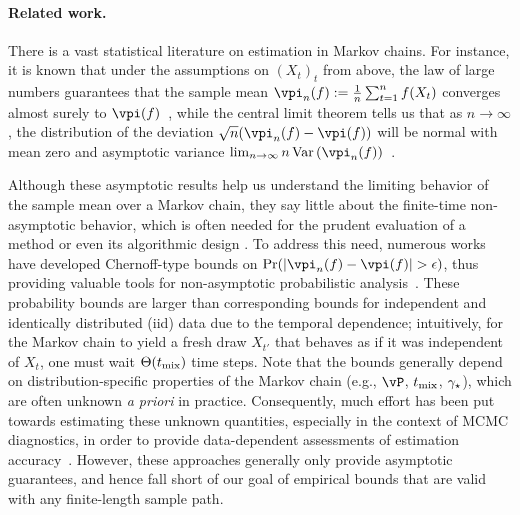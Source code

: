 \iffalse
\paragraph{Related work.}
There is a vast statistical literature on estimation in Markov chains.
For instance, it is known that under the assumptions on
$(X_t)_t$ from above, the law of large numbers guarantees that
the sample mean $\vpi_n(f) \defeq \frac1n \sum_{t=1}^n f(X_t)$
converges almost surely to $\vpi(f)$~\cite{meyn1993markov}, while the
central limit theorem tells us that as $n\to \infty$, the distribution
of the deviation $\sqrt{n}( \vpi_n(f)-\vpi(f))$ will be normal with
mean zero and asymptotic variance $\lim_{n\to\infty}
n\Var\Parens{\vpi_n(f)}$~\cite{kipnis1986central}.

Although these asymptotic results help us understand the limiting
behavior of the sample mean over a Markov chain, they say little about
the finite-time non-asymptotic behavior, which is often needed for the
prudent evaluation of a method or even its algorithmic design
\cite{
MCMCDiscussion93%
,DBLP:conf/valuetools/KontoyiannisLM06%
,BBL06%
,MniSzeAu08%
,MauPo09%
,LiLiWaSt11:KWIK%
,flegal2011implementing%
,Gyori-paulin15%
,SwaJoa15:LoggedBandit%
}.
To address this need, numerous works have developed Chernoff-type
bounds on $\Pr\parens{ |\vpi_n(f)-\vpi(f)| > \eps }$, thus providing
valuable tools for non-asymptotic probabilistic
analysis~\cite{gillman1998chernoff,leon2004optimal,DBLP:conf/valuetools/KontoyiannisLM06,
paulin15}.
These probability bounds are larger than corresponding bounds for
independent and identically distributed (iid) data due to the temporal
dependence; intuitively, for the Markov chain to yield a fresh draw
$X_{t'}$ that behaves as if it was independent of $X_t$, one must wait
$\Theta(t_{\operatorname{mix}})$ time steps.
Note that the bounds generally depend on distribution-specific
properties of the Markov chain (e.g., $\vP$, $t_{\operatorname{mix}}$, $\gamma_{\star}$), which are often
unknown \emph{a priori} in practice.
Consequently, much effort has been put towards estimating these
unknown quantities, especially in the context of MCMC diagnostics, in
order to provide data-dependent assessments of estimation
accuracy~\cite[e.g.,][]{MCMCDiscussion93,GaSmi00:eigval,jones2001,flegal2011implementing,1209.0703,Gyori-paulin15}.
However, these approaches generally only provide asymptotic
guarantees, and hence fall short of our goal of empirical bounds that
are valid with any finite-length sample path.

